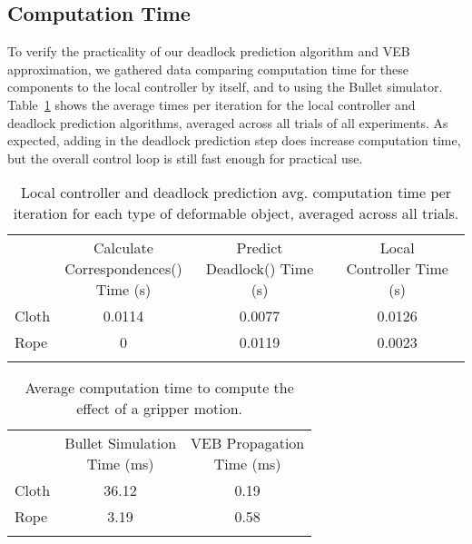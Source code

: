 \FloatBarrier

\subsection{Computation Time}

To verify the practicality of our deadlock prediction algorithm and VEB approximation, we gathered data comparing computation time for these components to the local controller by itself, and to using the Bullet simulator. Table~\ref{tab:control_statistics} shows the average times per iteration for the local controller and deadlock prediction algorithms, averaged across all trials of all experiments. As expected, adding in the deadlock prediction step does increase computation time, but the overall control loop is still fast enough for practical use.

\begin{table}[h]
\centering
\caption{Local controller and deadlock prediction avg. computation time per iteration for each type of deformable object, averaged across all trials.}
\label{tab:control_statistics}
\begin{tabular}{lccc}
\noalign{\smallskip}\hline\noalign{\smallskip}
& 
\parbox{1.3in}{\centering Calculate\\Correspondences()\\Time (s)} &
\parbox{0.8in}{\centering Predict\\Deadlock() Time (s)} &
\parbox{0.8in}{\centering Local\\Controller Time (s)} \\
\noalign{\smallskip}\hline\noalign{\smallskip}
Cloth   & 0.0114 & 0.0077 & 0.0126 \\
Rope    & 0      & 0.0119 & 0.0023 \\
\noalign{\smallskip}\hline
\end{tabular}
\end{table}

\begin{table}[h]
\centering
\caption{Average computation time to compute the effect of a gripper motion.}
\label{tab:prediction_statistics}
\begin{tabular}{lcc}
\noalign{\smallskip}\hline\noalign{\smallskip}
& 
\parbox{1.7in}{\centering Bullet Simulation\\Time (ms)} &
\parbox{2in}{\centering VEB Propagation\\Time (ms)} \\
\noalign{\smallskip}\hline\noalign{\smallskip}
Cloth   & 36.12 & 0.19 \\
Rope    &  3.19 & 0.58 \\
\noalign{\smallskip}\hline
\end{tabular}
\end{table}

